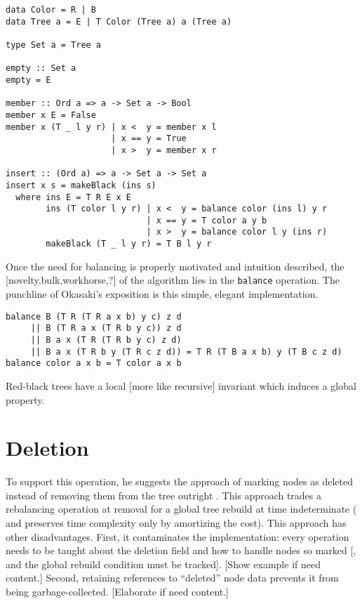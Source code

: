 \documentclass[preprint]{sigplanconf}
\begin{document}
\begin{verbatim}
data Color = R | B
data Tree a = E | T Color (Tree a) a (Tree a)

type Set a = Tree a

empty :: Set a
empty = E

member :: Ord a => a -> Set a -> Bool
member x E = False
member x (T _ l y r) | x <  y = member x l
                     | x == y = True
                     | x >  y = member x r 

insert :: (Ord a) => a -> Set a -> Set a
insert x s = makeBlack (ins s)
  where ins E = T R E x E
        ins (T color l y r) | x <  y = balance color (ins l) y r
                            | x == y = T color a y b
                            | x >  y = balance color l y (ins r)
        makeBlack (T _ l y r) = T B l y r
\end{verbatim}
Once the need for balancing is properly motivated and intuition described, the [novelty,bulk,workhorse,?] of the algorithm lies in the \texttt{balance} operation. The punchline of Okasaki's exposition is this simple, elegant implementation.
\begin{verbatim}
balance B (T R (T R a x b) y c) z d
     || B (T R a x (T R b y c)) z d
     || B a x (T R (T R b y c) z d)
     || B a x (T R b y (T R c z d)) = T R (T B a x b) y (T B c z d)
balance color a x b = T color a x b
\end{verbatim}

Red-black trees have a local [more like recursive] invariant which induces a global property.

\section{Deletion}

To support this operation, he suggests the approach of marking nodes as deleted instead of removing them from the tree outright \cite[p. 50]{okasaki1996purely}. This approach trades a rebalancing operation at removal for a global tree rebuild at time indeterminate ( and preserves time complexity only by amortizing the cost). This approach has other disadvantages. First, it contaminates the implementation: every operation needs to be taught about the deletion field and how to handle nodes so marked [, and the global rebuild condition must be tracked]. [Show example if need content.] Second, retaining references to ``deleted'' node data prevents it from being garbage-collected. [Elaborate if need content.]
\end{document}
